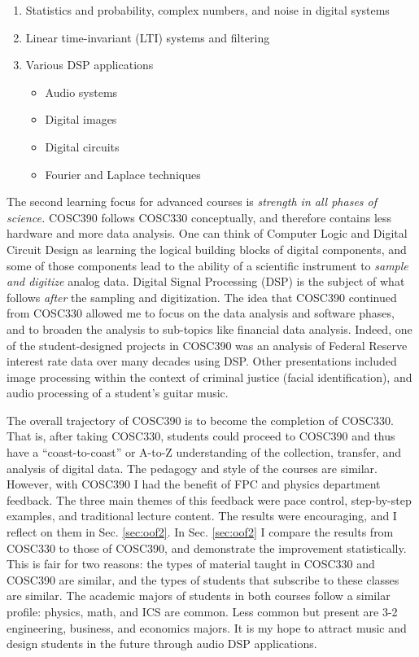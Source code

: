 \documentclass[../../../main.tex]{subfiles}
\begin{document}
\begin{enumerate}
\item Statistics and probability, complex numbers, and noise in digital systems
\item Linear time-invariant (LTI) systems and filtering
\item Various DSP applications
\begin{itemize}
\item Audio systems
\item Digital images
\item Digital circuits
\item Fourier and Laplace techniques
\end{itemize}
\end{enumerate}

The second learning focus for advanced courses is \textit{strength in all phases of science.}  COSC390 follows COSC330 conceptually, and therefore contains less hardware and more data analysis.  One can think of Computer Logic and Digital Circuit Design as learning the logical building blocks of digital components, and some of those components lead to the ability of a scientific instrument to \textit{sample and digitize} analog data.  Digital Signal Processing (DSP) is the subject of what follows \textit{after} the sampling and digitization.  The idea that COSC390 continued from COSC330 allowed me to focus on the data analysis and software phases, and to broaden the analysis to sub-topics like financial data analysis.  Indeed, one of the student-designed projects in COSC390 was an analysis of Federal Reserve interest rate data over many decades using DSP.  Other presentations included image processing within the context of criminal justice (facial identification), and audio processing of a student's guitar music.  \\ \hspace{0.1cm}

The overall trajectory of COSC390 is to become the completion of COSC330.  That is, after taking COSC330, students could proceed to COSC390 and thus have a ``coast-to-coast'' or A-to-Z understanding of the collection, transfer, and analysis of digital data.  The pedagogy and style of the courses are similar.  However, with COSC390 I had the benefit of FPC and physics department feedback.  The three main themes of this feedback were pace control, step-by-step examples, and traditional lecture content.  The results were encouraging, and I reflect on them in Sec. \ref{sec:oof2}.  In Sec. \ref{sec:oof2} I compare the results from COSC330 to those of COSC390, and demonstrate the improvement statistically.  This is fair for two reasons: the types of material taught in COSC330 and COSC390 are similar, and the types of students that subscribe to these classes are similar.  The academic majors of students in both courses follow a similar profile: physics, math, and ICS are common. Less common but present are 3-2 engineering, business, and economics majors.  It is my hope to attract music and design students in the future through audio DSP applications.  \\ \hspace{0.1cm}
\end{document}
